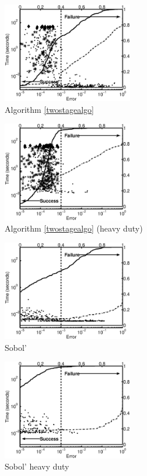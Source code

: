 \documentclass[graybox]{svmult}
\begin{document}
\begin{figure}
\begin{minipage}{5.7cm} \centering \includegraphics[width=5.7cm]{gaussiand=1iidErrTime.eps} \\ Algorithm \ref{twostagealgo}  \end{minipage}
\begin{minipage}{5.7cm} \centering \includegraphics[width=5.7cm]{gaussiand=1iidheavyErrTime.eps} \\ Algorithm \ref{twostagealgo} (heavy duty)\end{minipage}
\begin{minipage}{5.7cm} \centering \includegraphics[width=5.7cm]{gaussiand=1SobolErrTime.eps} \\  Sobol'\end{minipage}
\begin{minipage}{5.7cm} \centering \includegraphics[width=5.7cm]{gaussiand=1SobolheavyErrTime.eps} \\ Sobol' heavy duty \end{minipage}

\end{figure}
\end{document}
